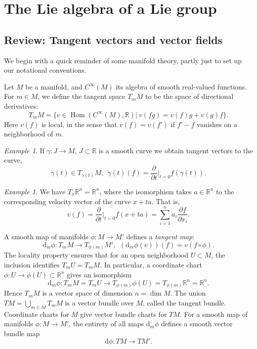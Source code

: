 \documentclass{article}
\theoremstyle{remark}
\newtheorem{exercise}[theorem]{Exercise}
\newtheorem{example}[theorem]{Example}
\newcommand{\R}{\mathbb{R}}
\newcommand{\C}{\mathbb{C}}
\newcommand{\on}{\operatorname}
\newcommand{\Hom}{ \on{Hom}} \newcommand{\Ind}{ \on{Ind}}
\newcommand{\SU}{ \on{SU}}
\newcommand{\SO}{ \on{SO}}
\renewcommand{\d}{{\mbox{d}}}
\newcommand{\f}{\frac}
\renewcommand{\H}{\mathbb{H}}
\newcommand{\p}{\partial}
\begin{document}





\section{The Lie algebra of a Lie group}
%
\subsection{Review: Tangent vectors and vector fields}
%
We begin with a quick reminder of some manifold theory, partly just to set up our notational conventions.

Let $M$ be a manifold, and $C^\infty(M)$ its algebra of smooth real-valued 
functions.  For $m\in M$, we define the tangent space 
$T_mM$ to be the space of directional derivatives: 
%
\[ T_mM=\{v\in \Hom(C^\infty(M),\R)|\ v(fg)=v(f) g+v(g) f\}.\]
%
Here $v(f)$ is local, in the sense that $v(f)=v(f')$ if $f'-f$ vanishes on a neighborhood of $m$. 
%
\begin{example}
If $\gamma\colon J\to M$, $J\subset \R$ is a smooth curve we obtain tangent vectors to the curve,
%
\[ \dot{\gamma}(t)\in T_{\gamma(t)}M,\ \ \dot{\gamma}(t)(f)= \f{\p}{\p t}|_{t=0}f(\gamma(t)).\] 
%
\end{example}
\begin{example}
We have $T_x\R^n=\R^n$, where the isomorphism takes $a\in\R^n$ to the 
corresponding velocity vector of the curve $x+t a$. That is, 
\[ v(f)=\f{\p}{\p t}|_{t=0}f(x+ta)=\sum_{i=1}^n a_i \f{\p f}{\p x_i}.\] 
\end{example}

A smooth map of manifolds $\phi\colon M\to M'$ defines a 
\emph{tangent map}:
\[ \d_m\phi\colon T_mM\to T_{\phi(m)}M',\ \ 
(\d_m\phi(v))(f)=v(f\circ \phi).\]
%
The locality property ensures that for an open neighborhood $U\subset M$, 
the inclusion identifies $T_mU=T_mM$. In particular, a coordinate chart 
$\phi\colon U\to \phi(U)\subset \R^n$ gives an isomorphism 
%
\[ \d_m\phi\colon T_mM=T_mU\to T_{\phi(m)}\phi(U)=T_{\phi(m)}\R^n=\R^n.\]
%
Hence $T_mM$ is a vector space of dimension $n=\dim M$. 
The union $TM=\bigcup_{m\in M}T_mM$ is a vector bundle over $M$, 
called the tangent bundle. Coordinate charts for $M$ give vector 
bundle charts for $TM$. For a smooth map of manifolds  
$\phi\colon M\to M'$, the entirety of all maps $\d_m\phi$ defines a smooth vector bundle map 
\[ \d\phi\colon TM\to TM'.\]
\end{document}
